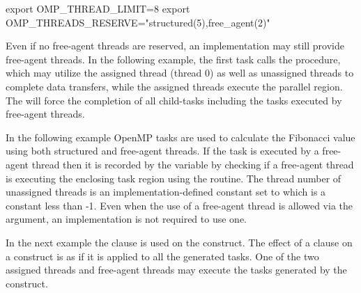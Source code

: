 \begin{boxedcode}
export OMP_THREAD_LIMIT=8
export OMP_THREADS_RESERVE="structured(5),free_agent(2)"
\end{boxedcode}

Even if no free-agent threads are reserved, an implementation may still provide free-agent threads. 
In the following example, the first task calls the  procedure, which may
utilize the assigned thread (thread 0) as well as unassigned threads to complete data transfers, 
while the assigned threads execute the parallel region. The  will force the completion 
of all child-tasks including the tasks executed by free-agent threads.


In the following example OpenMP tasks are used to calculate the Fibonacci value using both structured 
and free-agent threads. If the task is executed by a free-agent thread then it is recorded by the 
 variable by checking if a free-agent thread is executing the enclosing task region using 
the  routine. The thread number of unassigned threads is an implementation-defined 
constant set to  which is a constant less than -1. Even when the use of 
a free-agent thread is allowed via the  argument, an implementation is not required to use one. 



In the next example the  clause is used on the  construct. The effect of 
a  clause on a  construct is as if it is applied to all the generated tasks. 
One of the two assigned threads and free-agent threads may execute the tasks generated by the  construct. 


